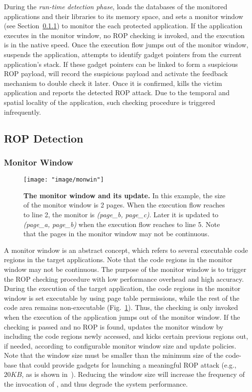 During the {\em run-time detection phase}, \name loads the databases of
the monitored applications and their libraries to its memory space,
and sets a monitor window (see Section~\ref{sec:monwin}) to monitor the each protected application.
If the application executes in the monitor window, no ROP checking is invoked,
and the execution is in the native speed. Once the execution flow
jumps out of the monitor window, \name suspends the application,
attempts to identify gadget pointers from the current application's stack.
If these gadget pointers can be linked to form a suspicious ROP payload,
\name will record the suspicious payload and activate the feedback mechanism to double check it later.
Once it is confirmed, \name kills the victim application and reports the detected ROP attack.
Due to the temporal and spatial locality of the application,
such checking procedure is triggered infrequently.


\subsection{ROP Detection}\label{sec:ropdetect}
\subsubsection{Monitor Window}\label{sec:monwin}

\begin{figure}
 \centering
\texttt{[image: "image/monwin"]}
\caption{\textbf{The monitor window and its update.} In this example, the size of the monitor window is 2 pages. When the execution flow reaches to line 2, the monitor is \emph{(page\_b, page\_c)}. Later it is updated to \emph{(page\_a, page\_b)} when the execution flow reaches to line 5. Note that the pages in the monitor window may not be continuous.}\label{fig:monwin}
\end{figure}

A monitor window is an abstract concept, which refers to several executable code regions in the target applications. Note that the code regions in the monitor window may not be continuous. The purpose of the monitor window is to trigger
the ROP checking procedure with low performance overhead
and high accuracy.
During the execution of the target application, the code regions in the monitor
window is set executable by \name using page table permissions,
while the rest of the code area remains non-executable (Fig.~\ref{fig:monwin}).
Thus, the \name checking is only invoked when the execution of the application
jumps out of the monitor window. If the checking is passed and no ROP is found,
\name updates the monitor window by including the code regions newly accessed, and kicks certain previous
regions out, if needed, according to configurable monitor window size and
update policies. Note that the window size must be smaller than the minimum size of the
code-base that could provide gadgets for launching a meaningful ROP attack
(e.g., $20KB$, as is shown in~\cite{q}). Reducing the window size will increase the
frequency of the invocation of \name, and thus degrade the system performance.


